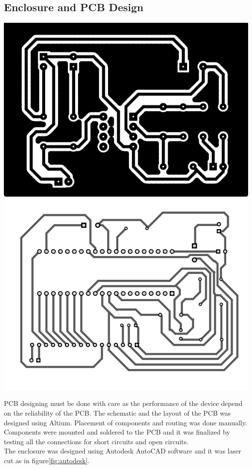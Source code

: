 \documentclass[12pt]{article}
\begin{document}
{\subsection{Enclosure and PCB Design}
\begin{center}
	\includegraphics[scale=0.6]{pcb2.jpg}
	\includegraphics[scale=0.6]{pcb1.jpg}
\end{center}

\;\;\;

PCB designing must be done with care as the performance of the device depend on the reliability of the PCB. The schematic and the layout of the PCB was designed using Altium. Placement of components and routing was done manually. Components were mounted and soldered to the PCB and it was finalized by testing all the connections for short circuits and open circuits.\\
\;\;\;
The enclosure was designed using Autodesk AutoCAD software and it was laser cut as in figure\ref{fig:autodesk}. 


}
\end{document}
